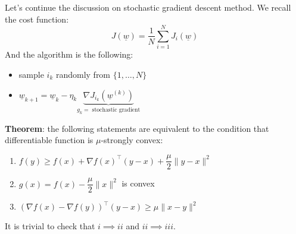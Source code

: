 Let's continue the discussion on stochastic gradient descent method. We recall the cost function:
\[
    J(\underline{w}) = \dfrac{1}{N}\sum_{i=1}^N J_i(\underline{w})    
\]
And the algorithm is the following:
\begin{itemize}
    \item sample $i_k$ randomly from $\{1,\dots,N\}$
    \item $\underline{w}_{k+1} = \underline{w}_k - \eta_k \underbrace{\nabla J_{i_k}(\underline{w}^{(k)})}_{g_k= \text{ stochastic gradient}}$
\end{itemize}
\textbf{Theorem}: the following statements are equivalent to the condition that differentiable function is $\mu$-strongly convex:
\begin{enumerate}[i]
    \item $f(y) \geq f(x) + \nabla f(x)^\intercal (y-x) + \dfrac{\mu}{2}\|y-x\|^2$
    \item $g(x) = f(x) - \dfrac{\mu}{2}\|x\|^2$ is convex
    \item $(\nabla f(x) - \nabla f(y))^\intercal (y-x) \geq \mu \|x-y\|^2$
\end{enumerate}
It is trivial to check that $i \implies ii$ and $ii \implies iii$. 

